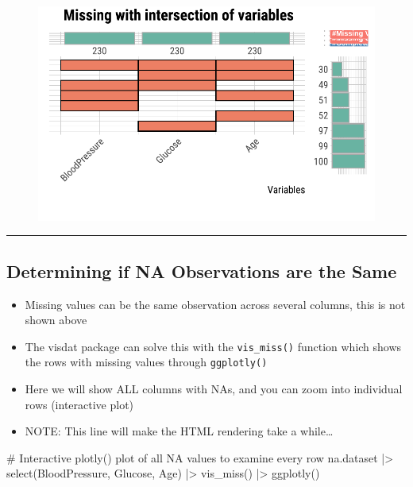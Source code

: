 \documentclass[
  letterpaper,
  DIV=11,
  numbers=noendperiod]{scrreprt}
\newenvironment{Shaded}{\begin{snugshade}}{\end{snugshade}}
\newcommand{\CommentTok}[1]{\textcolor[rgb]{0.37,0.37,0.37}{#1}}
\newcommand{\FunctionTok}[1]{\textcolor[rgb]{0.28,0.35,0.67}{#1}}
\newcommand{\NormalTok}[1]{\textcolor[rgb]{0.00,0.23,0.31}{#1}}
\newcommand{\SpecialCharTok}[1]{\textcolor[rgb]{0.37,0.37,0.37}{#1}}
\providecommand{\tightlist}{%
  \setlength{\itemsep}{0pt}\setlength{\parskip}{0pt}}\usepackage{longtable,booktabs,array}
\begin{document}
\begin{figure}[H]

{\centering \includegraphics{./ImputatingLikeDataScientist_files/figure-pdf/unnamed-chunk-8-1.pdf}

}

\end{figure}

\begin{center}\rule{0.5\linewidth}{0.5pt}\end{center}

\hypertarget{determining-if-na-observations-are-the-same}{%
\subsection{Determining if NA Observations are the
Same}\label{determining-if-na-observations-are-the-same}}

\begin{itemize}
\tightlist
\item
  Missing values can be the same observation across several columns,
  this is not shown above
\item
  The visdat package can solve this with the \texttt{vis\_miss()}
  function which shows the rows with missing values through
  \texttt{ggplotly()}
\item
  Here we will show ALL columns with NAs, and you can zoom into
  individual rows (interactive plot)
\item
  NOTE: This line will make the HTML rendering take a while\ldots{}
\end{itemize}

\begin{Shaded}
\begin{Highlighting}[]
\CommentTok{\# Interactive plotly() plot of all NA values to examine every row}
\NormalTok{na.dataset }\SpecialCharTok{|\textgreater{}}
 \FunctionTok{select}\NormalTok{(BloodPressure, Glucose, Age) }\SpecialCharTok{|\textgreater{}}
 \FunctionTok{vis\_miss}\NormalTok{() }\SpecialCharTok{|\textgreater{}}
 \FunctionTok{ggplotly}\NormalTok{() }
\end{Highlighting}
\end{Shaded}
\end{document}
